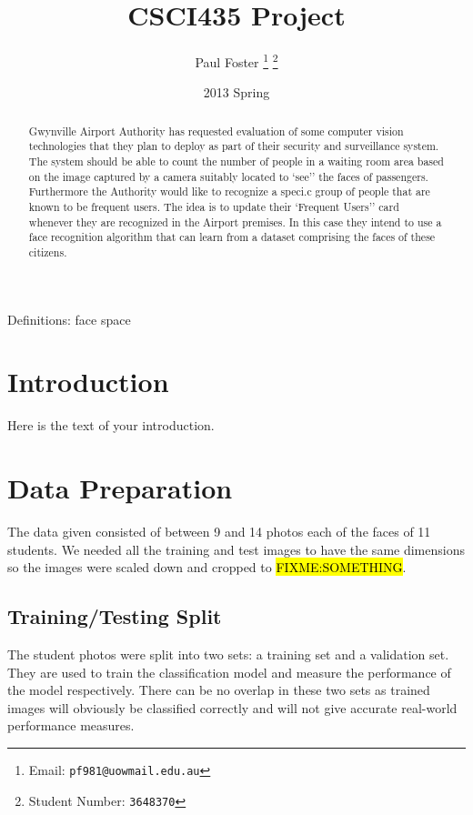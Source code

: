 \documentclass{article}
\begin{document}
\title{CSCI435 Project}
\author{Paul Foster
	\thanks{Email: \texttt{pf981@uowmail.edu.au}}
	\thanks{Student Number: \texttt{3648370}}}
\date{2013 Spring}

\maketitle

\renewcommand\abstractname{Executive Summary}
\begin{abstract}
Gwynville Airport Authority has requested evaluation of some computer vision
technologies that they plan to deploy as part of their security and surveillance system.
The system should be able to count the number of people in a waiting room area based
on the image captured by a camera suitably located to `see'' the faces of passengers. Furthermore the Authority would like to recognize a speci.c group of people that are known
to be frequent users. The idea is to update their `Frequent Users'' card whenever they
are recognized in the Airport premises. In this case they intend to use a face recognition
algorithm that can learn from a dataset comprising the faces of these citizens.
\end{abstract}

Definitions: face space

\section{Introduction}
Here is the text of your introduction.

\section{Data Preparation}
The data given consisted of between 9 and 14 photos each of the faces of 11 students. We needed all the training and test images to have the same dimensions so the images were scaled down and cropped to \hl{FIXME:SOMETHING}.

\subsection{Training/Testing Split}
The student photos were split into two sets: a training set and a validation set. They are used to train the classification model and measure the performance of the model respectively. There can be no overlap in these two sets as trained images will obviously be classified correctly and will not give accurate real-world performance measures.
\end{document}
